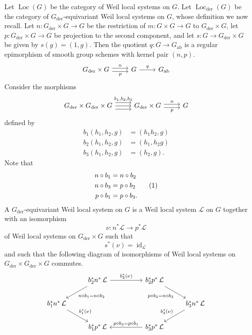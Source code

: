 \documentclass[10pt]{amsart}
\theoremstyle{plain}
\theoremstyle{definition}
\DeclareMathOperator{\id}{id}
\DeclareMathOperator{\Loc}{Loc}
\newcommand{\der}{_{\operatorname{der}}}
\newcommand{\ab}{_{\operatorname{ab}}}
\newcommand{\cs}[1]{{\mathcal{#1}}}
\newcommand\numberthis{\addtocounter{equation}{1}\tag{\theequation}}
\begin{document}
Let $\Loc(G)$ be the category of Weil local systems on $G$.
Let $\Loc\der(G)$ be the category of $G\der$-equivariant Weil local systems on $G$, whose definition we now recall.
Let $n : G\der\times G\to G$ be the restriction of $m : G\times G\to G$ to $G\der\times G$,
let $p : G\der\times G \to G$ be projection to the second component, and let $s: G \to G\der\times G$ be given by $s(g) = (1,g)$.
Then the quotient $q : G \to G\ab$ is a regular epimorphism of smooth group schemes with kernel pair $(n,p)$.
\[
\begin{tikzcd}
G\der\times G
 \arrow[shift left=1]{r}{n}
  \arrow[shift right=1,swap]{r}{p}
&
G 
\arrow{r}{q}
& 
G\ab
\end{tikzcd}
\]
Consider the morphisms
\[
\begin{tikzcd}
G\der \times G\der \times G 
\arrow[shift left=2]{r}{b_1, b_2, b_3} 
\arrow{r}{}
\arrow[shift right=2]{r}{} 
& G\der \times G 
\arrow[shift left=1]{r}{n}
\arrow[shift right=1]{r}[swap]{p}
 & G 
\end{tikzcd}
\]
defined by 
\begin{align*}
b_1(h_1,h_2,g) &= (h_1h_2,g) \\
b_2(h_1,h_2,g) &= (h_1,h_2g) \\
b_3(h_1,h_2,g) &= (h_2,g).
\end{align*}
Note that
\begin{align*}
n\circ b_1 &= n\circ b_2 \\
n\circ b_3 &= p\circ b_2 \numberthis \label{eqn:bap}\\
p\circ b_1 &= p\circ b_3.
\end{align*}
A $G\der$-equivariant Weil local system on $G$ is a Weil local system $\cs{L}$ on $G$ together with an isomorphism  
\[
\nu : n^*\cs{L} \to p^*\cs{L}
\] 
of Weil local systems on $G\der\times G$ such that 
\begin{equation}\label{E1}
s^*(\nu) = \id_{\cs{L}}
\end{equation}
and such that the following diagram of isomorphisms of Weil local systems on $G\der\times G\der\times G$ commutes. 
\begin{equation}\label{E2}
\begin{tikzcd}
\ &  \arrow{dl}{n\circ b_1 = n\circ b_2}  b_2^*  n^*\, \mathcal{L} \arrow{rr}{b_2^*(\nu)} && b_2^* p^*\, \mathcal{L} \arrow{dr}[swap]{p\circ b_2 = n\circ b_3} & \\
b_1^* n^*\, \mathcal{L} \arrow{dr}{b_1^*(\nu)} &&&&   \arrow{dl}[swap]{b_3^*(\nu)} b_3^* n^*\, \mathcal{L} \\
& b_1^* p^*\, \mathcal{L}  && \arrow{ll}[swap]{p\circ b_3 = p\circ b_1} b_3^* p^*\, \mathcal{L} & 
\end{tikzcd}
\end{equation}
\end{document}
